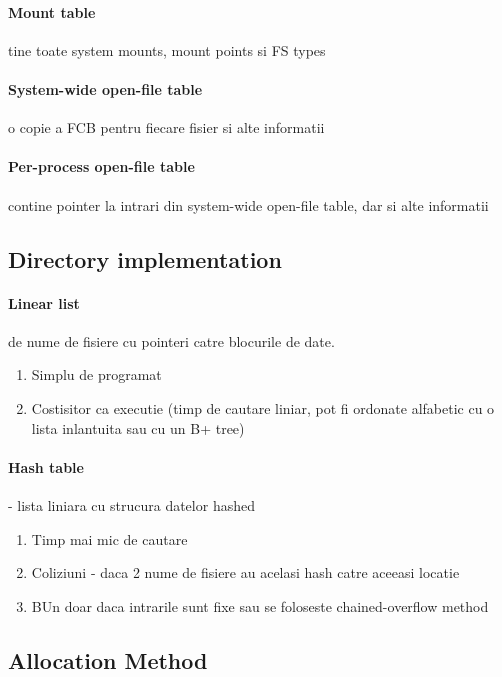\documentclass{article}
\begin{document}
\paragraph*{Mount table} tine toate system mounts, mount points si FS types
\paragraph*{System-wide open-file table} o copie a FCB pentru fiecare fisier si alte informatii
\paragraph*{Per-process open-file table} contine pointer la intrari din system-wide open-file table, dar si alte informatii

\subsection*{Directory implementation}
\paragraph*{Linear list} de nume de fisiere cu pointeri catre blocurile de date.
\begin{enumerate}
    \item Simplu de programat
    \item Costisitor ca executie (timp de cautare liniar, pot fi ordonate alfabetic cu o lista inlantuita sau cu un B+ tree)
\end{enumerate}

\paragraph*{Hash table} - lista liniara cu strucura datelor hashed
\begin{enumerate}
    \item Timp mai mic de cautare
    \item Coliziuni - daca 2 nume de fisiere au acelasi hash catre aceeasi locatie
    \item BUn doar daca intrarile sunt fixe sau se foloseste chained-overflow method
\end{enumerate}

\subsection*{Allocation Method}
\end{document}
